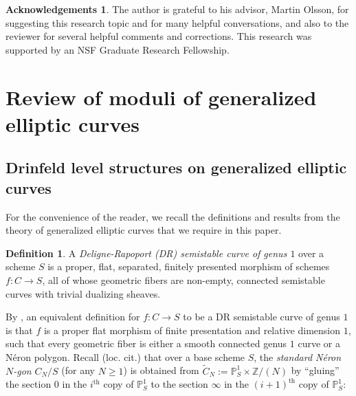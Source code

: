 \documentclass[11pt]{amsart}
\theoremstyle{definition}
\newtheorem{definition}[subsection]{Definition}
\newtheorem*{ack}{Acknowledgements}
\begin{document}
\begin{ack}
The author is grateful to his advisor, Martin Olsson, for suggesting this research topic and for many helpful conversations, and also to the reviewer for several helpful comments and corrections. This research was supported by an NSF Graduate Research Fellowship.
\end{ack}

\section{Review of moduli of generalized elliptic curves}\label{section2}

\subsection*{Drinfeld level structures on generalized elliptic curves}
For the convenience of the reader, we recall the definitions and results from the theory of generalized elliptic curves that we require in this paper.

\begin{definition}
A \textit{Deligne-Rapoport (DR) semistable curve of genus $1$} over a scheme $S$ is a proper, flat, separated, finitely presented morphism of schemes $f:C \rightarrow S$, all of whose geometric fibers are non-empty, connected semistable curves with trivial dualizing sheaves.
\end{definition}

By \cite[\S$\textrm{II.1}$]{DR}, an equivalent definition for $f:C \rightarrow S$ to be a DR semistable curve of genus $1$ is that $f$ is a proper flat morphism of finite presentation and relative dimension $1$, such that every geometric fiber is either a smooth connected genus $1$ curve or a N\'eron polygon. Recall (loc. cit.) that over a base scheme $S$, the \textit{standard N\'eron $N$-gon} $C_N/S$ (for any $N\geq 1$) is obtained from $\widetilde{C}_N := \mathbb{P}^1_S \times \mathbb{Z}/(N)$ by ``gluing'' the section $0$ in the $i^{\mathrm{th}}$ copy of $\mathbb{P}^1_S$ to the section $\infty$ in the $(i+1)^{\mathrm{th}}$ copy of $\mathbb{P}^1_S$:

\begin{center}
\end{center}
\end{document}
